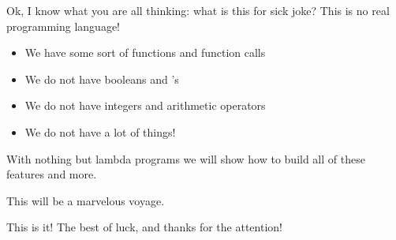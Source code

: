 \documentclass{beamer}
\begin{document}
\begin{frame}[fragile]{\CurrentSection}
\begin{exampleblock}{}
Ok, I know what you are all thinking: what is this for sick joke? This is no real programming language!
\end{exampleblock}

 
\begin{exampleblock}{}
\begin{itemize}
\item We have some sort of functions and function calls
\item We do not have booleans and 's
\item We do not have integers and arithmetic operators
\item We do not have a lot of things!

\end{itemize}

\end{exampleblock}

 

\end{frame}

\begin{frame}[fragile]{\CurrentSection}
\begin{block}{\CurrentSubSection}
With nothing but lambda programs we will show how to build all of these features and more.
\end{block}


\end{frame}

\begin{frame}[fragile]{\CurrentSection}
\begin{block}{\CurrentSubSection}
This will be a marvelous voyage.
\end{block}


\end{frame}


\begin{frame}{This is it!}
\center
\fontsize{18pt}{7.2}\selectfont
The best of luck, and thanks for the attention!
\end{frame}
\end{document}
